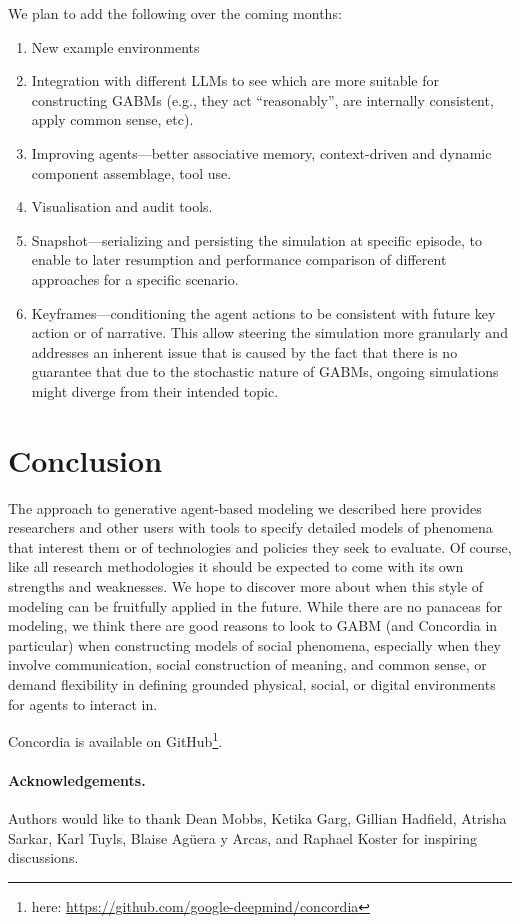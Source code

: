 \documentclass[11pt, a4paper, logo, twocolumn, internal, copyright, numbering]{googledeepmind}
\begin{document}
We plan to add the following over the coming months:
\begin{enumerate}
    \item New example environments
    \item Integration with different LLMs to see which are more suitable for constructing GABMs (e.g., they act ``reasonably'', are internally consistent, apply common sense, etc).
    \item Improving agents---better associative memory, context-driven and dynamic component assemblage, tool use.
    \item Visualisation and audit tools.
    \item Snapshot---serializing and persisting the simulation at specific episode, to enable to later resumption and performance comparison of different approaches for a specific scenario. 
    \item Keyframes---conditioning the agent actions to be consistent with future key action or of narrative. This allow steering the simulation more granularly and addresses an inherent issue that is caused by the fact that there is no guarantee that due to the stochastic nature of GABMs, ongoing simulations might diverge from their intended topic.
\end{enumerate}

\section{Conclusion}
\label{sec:conclusion}
The approach to generative agent-based modeling we described here provides researchers and other users with tools to specify detailed models of phenomena that interest them or of technologies and policies they seek to evaluate. Of course, like all research methodologies it should be expected to come with its own strengths and weaknesses. We hope to discover more about when this style of modeling can be fruitfully applied in the future. While there are no panaceas for modeling, we think there are good reasons to look to GABM (and Concordia in particular) when constructing models of social phenomena, especially when they involve communication, social construction of meaning, and common sense, or demand flexibility in defining grounded physical, social, or digital environments for agents to interact in.

Concordia is available on GitHub\footnote{here: \url{https://github.com/google-deepmind/concordia}}.

\paragraph{Acknowledgements.} Authors would like to thank Dean Mobbs, Ketika Garg, Gillian Hadfield, Atrisha Sarkar, Karl Tuyls, Blaise Ag\"{u}era y Arcas, and Raphael Koster for inspiring discussions. 
\end{document}
